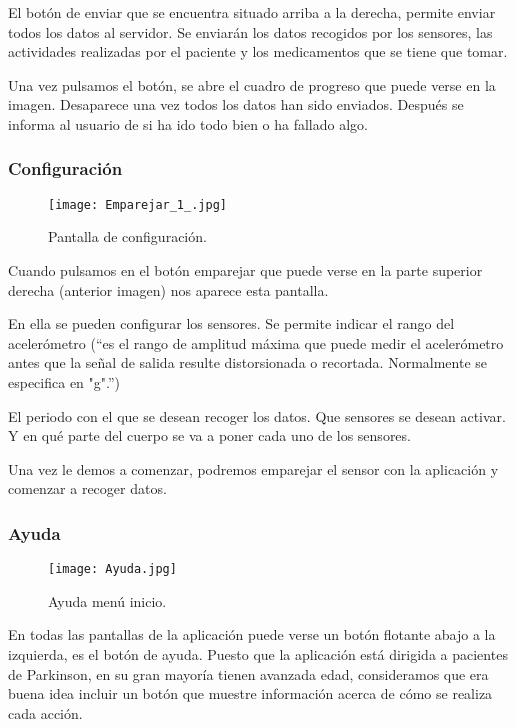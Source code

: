 \documentclass[11pt,spanish]{article}
\begin{document}
El botón de enviar que se encuentra situado arriba a la derecha, permite enviar todos los datos al servidor. Se enviarán los datos recogidos por los sensores, las actividades realizadas por el paciente y los medicamentos que se tiene que tomar.
\newline

Una vez pulsamos el botón, se abre el cuadro de progreso que puede verse en la imagen. Desaparece una vez todos los datos han sido enviados. Después se informa al usuario de si ha ido todo bien o ha fallado algo.
\newline

\subsubsection{Configuración}
\begin{figure}[!htb]
\centering
\texttt{[image: Emparejar\_1\_.jpg]}
\caption{Pantalla de configuración.}
\end{figure}

Cuando pulsamos en el botón emparejar que puede verse en la parte superior derecha (anterior imagen) nos aparece esta pantalla.

En ella se pueden configurar los sensores. Se permite indicar el rango del acelerómetro (“es el rango de amplitud máxima que puede medir el acelerómetro antes que la señal de salida resulte distorsionada o recortada. Normalmente se especifica en "g".”)
\newline

El periodo con el que se desean recoger los datos.
Que sensores se desean activar.
Y en qué parte del cuerpo se va a poner cada uno de los sensores.
\newline

Una vez le demos a comenzar, podremos emparejar el sensor con la aplicación y comenzar a recoger datos.
\newline

\subsubsection{Ayuda}
\begin{figure}[!htb]
\centering
\texttt{[image: Ayuda.jpg]}
\caption{Ayuda menú inicio.}
\end{figure}

En todas las pantallas de la aplicación puede verse un botón flotante abajo a la izquierda, es el botón de ayuda. Puesto que la aplicación está dirigida a pacientes de Parkinson, en su gran mayoría tienen avanzada edad, consideramos que era buena idea incluir un botón que muestre información acerca de cómo se realiza cada acción.
\newline
\end{document}
